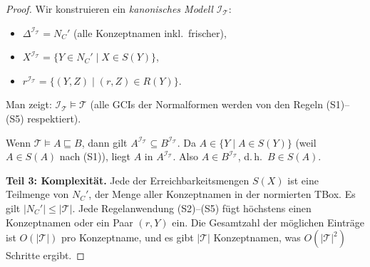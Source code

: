 ﻿\documentclass[a4paper,12pt]{article}
\theoremstyle{definition}
\theoremstyle{plain}
\theoremstyle{remark}
\newcommand{\Tbox}{\ensuremath{\mathcal{T}}}
\newcommand{\interp}[1]{\ensuremath{\mathcal{#1}}}
\newcommand{\Dom}[1]{\ensuremath{\Delta^{\interp{#1}}}}
\begin{document}
\begin{proof}
Wir konstruieren ein \emph{kanonisches Modell} $\interp{I}_\Tbox$:
\begin{itemize}
  \item $\Dom{I_\Tbox} = N_C'$ (alle Konzeptnamen inkl.\ frischer),
  \item $X^\interp{I_\Tbox} = \{Y \in N_C' \mid X \in S(Y)\}$,
  \item $r^\interp{I_\Tbox} = \{(Y,Z) \mid (r,Z) \in R(Y)\}$.
\end{itemize}

Man zeigt: $\interp{I_\Tbox} \models \Tbox$ (alle GCIs der Normalformen
werden von den Regeln (S1)--(S5) respektiert).

Wenn $\Tbox \models A \sqsubseteq B$, dann gilt
$A^\interp{I_\Tbox} \subseteq B^\interp{I_\Tbox}$.
Da $A \in \{Y \mid A \in S(Y)\}$ (weil $A \in S(A)$ nach (S1)),
liegt $A$ in $A^\interp{I_\Tbox}$.
Also $A \in B^\interp{I_\Tbox}$, d.\,h.\ $B \in S(A)$.

\textbf{Teil 3: Komplexit{\"{a}}t.}
Jede der Erreichbarkeitsmengen $S(X)$ ist eine Teilmenge von $N_C'$,
der Menge aller Konzeptnamen in der normierten TBox.
Es gilt $|N_C'| \leq |\Tbox|$.
Jede Regelanwendung (S2)--(S5) f{\"{u}}gt h{\"{o}}chstens einen Konzeptnamen
oder ein Paar $(r,Y)$ ein. Die Gesamtzahl der m{\"{o}}glichen Eintr{\"{a}}ge ist
$O(|\Tbox|)$ pro Konzeptname, und es gibt $|\Tbox|$ Konzeptnamen,
was $O(|\Tbox|^2)$ Schritte ergibt.
\qedhere
\end{proof}
\end{document}
